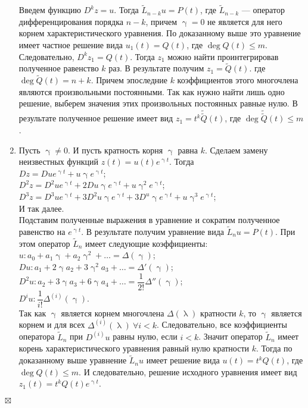 \documentclass[a4paper, 12pt]{report}
\newenvironment{Proof} %
{\par\noindent{$\blacklozenge$}} %
{\hfill$\scriptstyle\boxtimes$}
\renewcommand{\lambda}{\uplambda}
\begin{document}
\begin{Proof}
\begin{enumerate}
	Введем функцию $D^kz = u$. Тогда $\widetilde{L}_{n-k}u = P(t)$, где $\widetilde{L}_{n-k}$ --- оператор дифференцирования порядка $n-k$, причем $\upgamma = 0$ не является для него корнем характеристического уравнения. По доказанному выше это уравнение имеет частное решение вида $u_1(t) = Q(t)$, где $\deg Q(t) \leqslant m$. Следовательно, $D^kz_1 = Q(t)$. Тогда $z_1$ можно найти проинтегрировав полученное равенство $k$ раз. В результате получим $z_1 = \widetilde{Q}(t)$. где $\deg \widetilde{Q}(t) = n + k$. Причем эпоследние $k$ коэффициентов этого многочлена являются произвольными постоянными. Так как нужно найти лишь одно решение, выберем значения этих произвольных постоянных равные нулю. В результате полученное решение имеет вид $z_1 = t^k\widetilde{\widetilde{Q}}(t)$, где $\deg \widetilde{\widetilde{Q}}(t) \leqslant m$.
	\item Пусть $\upgamma \ne 0$. И пусть кратность корня $\upgamma$ равна $k$. Сделаем замену неизвестных функций $z(t) = u(t)e^{\upgamma t}$. Тогда\\
	$Dz = Due^{\upgamma t} + u \upgamma e ^{\upgamma t}$;\\
	$D^2 z = D^2 u e^{\upgamma t} + 2 D u \upgamma e^{\upgamma t} + u\upgamma^2 e^{\upgamma t}$;\\
	$D^3 z = D^3 u e^{\upgamma t} + 3 D^2 u \upgamma e^{\upgamma t} + 3 D^ u \upgamma e^{\upgamma t}+ u\upgamma^3 e^{\upgamma t}$;\\
	И так далее.\\
	Подставим полученные выражения в уравнение и сократим полученное равенство на $e^{\upgamma t}$. В результате получим уравнение вида $\widetilde{L}_nu = P(t)$. При этом оператор $\widetilde{L}_n$ имеет следующие коэффициенты:\\
	$u : a_0 + a_1 \upgamma + a_2 \upgamma^2 + \ldots = \Delta (\upgamma)$;\\
	$Du : a_1 + 2\upgamma a_2 + 3\upgamma^2a_3 + \ldots = \Delta' (\upgamma)$;\\
	$D^2 u : a_2 + 3\upgamma a_3 + 6\upgamma a_4 + \ldots = \dfrac{1}{2!}\Delta''(\upgamma)$;\\
	$D^i u: \dfrac{1}{i!}\Delta^{(i)}(\upgamma).$\\
	Так как $\upgamma$ является корнем многочлена $\Delta(\lambda)$ кратности $k$, то $\upgamma$ является корнем и для всех $\Delta^{(i)}(\lambda)\ \forall i < k$. Следовательно, все коэффициенты оператора $\widetilde{L}_n$ при $D^{(i)}u$ равны нулю, если $i < k$. Значит оператор $\widetilde{L}_n$ имеет корень характеристического уравнения равный нулю кратности $k$. Тогда по доказанному выше уравнение $\widetilde{L}_n u$ имеет решение вида $u(t) = t^k Q(t)$, где $\deg Q(t)\leqslant m$. И следовательно, решение исходного уравнения имеет вид $z_1(t) = t^k Q(t)e^{\upgamma t}$.
\end{enumerate}
\end{Proof}
\end{document}
